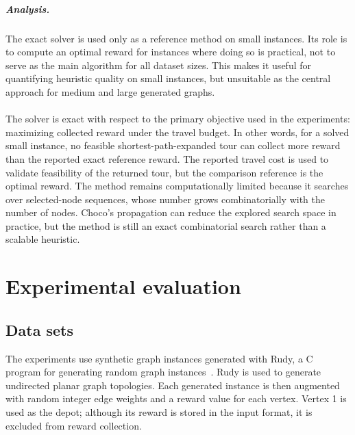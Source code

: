 \documentclass[report,english,cleveref,autoref,a4paper]{lipics-v2021}
\newcommand{\explanation}[1]{\emph{Explanation:} #1}
\newcommand{\explanation}[1]{}
\begin{document}
\subparagraph{Analysis.}

The exact solver is used only as a reference method on small instances. Its role
is to compute an optimal reward for instances where doing so is practical, not to
serve as the main algorithm for all dataset sizes. This makes it useful for
quantifying heuristic quality on small instances, but unsuitable as the central
approach for medium and large generated graphs.
\\ \\
The solver is exact with respect to the primary objective used in the
experiments: maximizing collected reward under the travel budget. In other words,
for a solved small instance, no feasible shortest-path-expanded tour can collect
more reward than the reported exact reference reward. The reported travel cost is
used to validate feasibility of the returned tour, but the comparison reference
is the optimal reward. The method remains computationally limited because it
searches over selected-node sequences, whose number grows combinatorially with
the number of nodes. Choco's propagation can reduce the explored search space in
practice, but the method is still an exact combinatorial search rather than a
scalable heuristic.

\section{Experimental evaluation}
\label{sec:evaluation}

\subsection{Data sets}
\label{subsec:data}

The experiments use synthetic graph instances generated with Rudy, a C program
for generating random graph instances~\cite{rudy}. Rudy is used to generate
undirected planar graph topologies. Each generated instance is then augmented
with random integer edge weights and a reward value for each vertex. Vertex 1 is
used as the depot; although its reward is stored in the input format, it is
excluded from reward collection.
\end{document}

